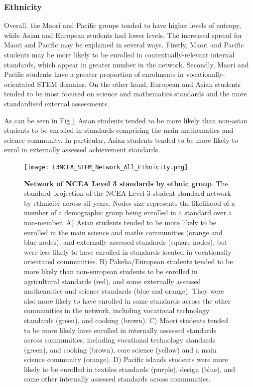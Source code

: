 \subsubsection*{Ethnicity}
Overall, the Maori and Pacific groups tended to have higher levels of entropy, while Asian and European students had lower levels. The increased spread for Maori and Pacific may be explained in several ways. Firstly, Maori and Pacific students may be more likely to be enrolled in contextually-relevant internal standards, which appear in greater number in the network. Secondly, Maori and Pacific students have a greater proportion of enrolments in vocationally-orientated STEM domains. On the other hand, European and Asian students tended to be most focused on science and mathematics standards and the more standardised external assessments.

As can be seen in Fig \ref{fig:NetworkEthnicity} Asian students tended to be more likely than non-asian students to be enrolled in standards comprising the main mathematics and science community. In particular, Asian students tended to be more likely to enrol in externally assessed achievement standards.   

\begin{figure}
    \centering
    \texttt{[image: L3NCEA\_STEM\_Network\_All\_Ethnicity.png]}
    \caption{\textbf{Network of NCEA Level 3 standards by ethnic group}. The standard projection of the NCEA Level 3 student-standard network by ethnicity across all years. Nodes size represents the likelihood of a member of a demographic group being enrolled in a standard over a non-member. A) Asian students tended to be more likely to be enrolled in the main science and maths communities (orange and blue nodes), and externally assessed standards (square nodes), but were less likely to have enrolled in standards located in vocationally-orientated communities. B) Pakeha/European students tended to be more likely than non-european students to be enrolled in agricultural standards (red), and some externally assessed mathematics and science standards (blue and orange). They were also more likely to have enrolled in some standards across the other communities in the network, including vocational technology standards (green), and cooking (brown). C) M\={a}ori students tended to be more likely have enrolled in internally assessed standards across communities, including vocational technology standards (green), and cooking (brown), core science (yellow) and a main science community (orange). D) Pacific islands students were more likely to be enrolled in textiles standards (purple), design (blue), and some other internally assessed standards across communities.
    }
    
    \label{fig:NetworkEthnicity}
\end{figure}

